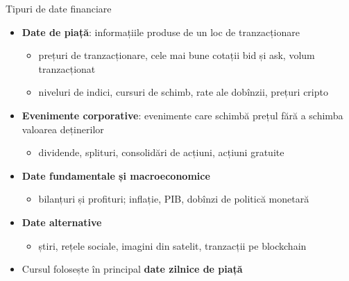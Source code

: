 \begin{frame}{Tipuri de date financiare}
\itemsize{\small}
\begin{itemize}
    \item \textbf{Date de piață}: informațiile produse de un loc de tranzacționare
    \begin{itemize}
        \item prețuri de tranzacționare, cele mai bune cotații bid și ask, volum tranzacționat
        \item niveluri de indici, cursuri de schimb, rate ale dobînzii, prețuri cripto
    \end{itemize}
    \item \textbf{Evenimente corporative}: evenimente care schimbă prețul fără a schimba valoarea deținerilor
    \begin{itemize}
        \item dividende, splituri, consolidări de acțiuni, acțiuni gratuite
    \end{itemize}
    \item \textbf{Date fundamentale și macroeconomice}
    \begin{itemize}
        \item bilanțuri și profituri; inflație, PIB, dobînzi de politică monetară
    \end{itemize}
    \item \textbf{Date alternative}
    \begin{itemize}
        \item știri, rețele sociale, imagini din satelit, tranzacții pe blockchain
    \end{itemize}
    \item Cursul folosește în principal \textbf{date zilnice de piață}
\end{itemize}
\end{frame}

